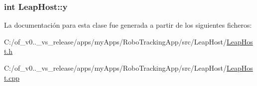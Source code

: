 \subsubsection[{y}]{\setlength{\rightskip}{0pt plus 5cm}int Leap\+Host\+::y\hspace{0.3cm}{\ttfamily [private]}}\label{class_leap_host_a29854b6d8e1891c89cad39a74fb0368b}


La documentación para esta clase fue generada a partir de los siguientes ficheros\+:\begin{DoxyCompactItemize}
\item 
C\+:/of\+\_\+v0..\+\_\+vs\+\_\+release/apps/my\+Apps/\+Robo\+Tracking\+App/src/\+Leap\+Host/\hyperlink{_leap_host_8h}{Leap\+Host.\+h}\item 
C\+:/of\+\_\+v0..\+\_\+vs\+\_\+release/apps/my\+Apps/\+Robo\+Tracking\+App/src/\+Leap\+Host/\hyperlink{_leap_host_8cpp}{Leap\+Host.\+cpp}\end{DoxyCompactItemize}
